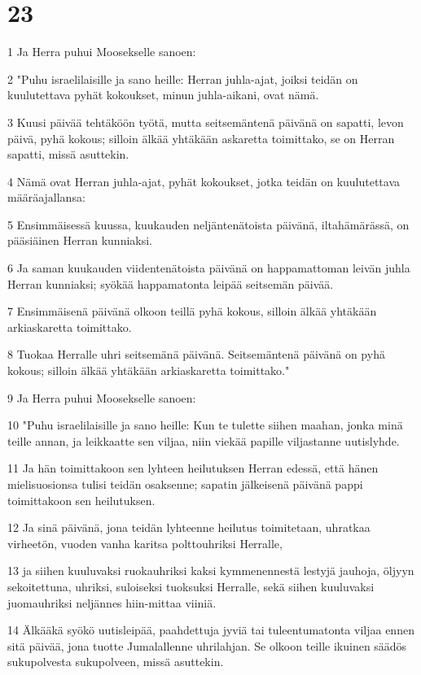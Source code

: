 \chapter{23}

\par 1 Ja Herra puhui Moosekselle sanoen:
\par 2 "Puhu israelilaisille ja sano heille: Herran juhla-ajat, joiksi teidän on kuulutettava pyhät kokoukset, minun juhla-aikani, ovat nämä.
\par 3 Kuusi päivää tehtäköön työtä, mutta seitsemäntenä päivänä on sapatti, levon päivä, pyhä kokous; silloin älkää yhtäkään askaretta toimittako, se on Herran sapatti, missä asuttekin.
\par 4 Nämä ovat Herran juhla-ajat, pyhät kokoukset, jotka teidän on kuulutettava määräajallansa:
\par 5 Ensimmäisessä kuussa, kuukauden neljäntenätoista päivänä, iltahämärässä, on pääsiäinen Herran kunniaksi.
\par 6 Ja saman kuukauden viidentenätoista päivänä on happamattoman leivän juhla Herran kunniaksi; syökää happamatonta leipää seitsemän päivää.
\par 7 Ensimmäisenä päivänä olkoon teillä pyhä kokous, silloin älkää yhtäkään arkiaskaretta toimittako.
\par 8 Tuokaa Herralle uhri seitsemänä päivänä. Seitsemäntenä päivänä on pyhä kokous; silloin älkää yhtäkään arkiaskaretta toimittako."
\par 9 Ja Herra puhui Moosekselle sanoen:
\par 10 "Puhu israelilaisille ja sano heille: Kun te tulette siihen maahan, jonka minä teille annan, ja leikkaatte sen viljaa, niin viekää papille viljastanne uutislyhde.
\par 11 Ja hän toimittakoon sen lyhteen heilutuksen Herran edessä, että hänen mielisuosionsa tulisi teidän osaksenne; sapatin jälkeisenä päivänä pappi toimittakoon sen heilutuksen.
\par 12 Ja sinä päivänä, jona teidän lyhteenne heilutus toimitetaan, uhratkaa virheetön, vuoden vanha karitsa polttouhriksi Herralle,
\par 13 ja siihen kuuluvaksi ruokauhriksi kaksi kymmenennestä lestyjä jauhoja, öljyyn sekoitettuna, uhriksi, suloiseksi tuoksuksi Herralle, sekä siihen kuuluvaksi juomauhriksi neljännes hiin-mittaa viiniä.
\par 14 Älkääkä syökö uutisleipää, paahdettuja jyviä tai tuleentumatonta viljaa ennen sitä päivää, jona tuotte Jumalallenne uhrilahjan. Se olkoon teille ikuinen säädös sukupolvesta sukupolveen, missä asuttekin.
